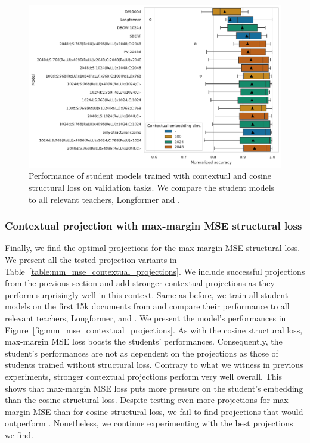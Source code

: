 \begin{figure}

  \includegraphics[width=\textwidth]{img/projections_contextual_cos.pdf}

  \caption{Performance of student models trained with contextual and cosine
  structural loss on validation tasks. We compare the student models to all
  relevant teachers, Longformer and .}

  \label{fig:cos_projections_contextual}

\end{figure}

\subsubsection{Contextual projection with max-margin MSE structural
loss}\label{section:projections_mm_mse}

Finally, we find the optimal projections for the max-margin MSE structural
loss. We present all the tested projection variants in
Table~\ref{table:mm_mse_contextual_projections}. We include successful
projections from the previous section and add stronger contextual projections
as they perform surprisingly well in this context. Same as before, we train all
student models on the first 15k documents from  and compare
their performance to all relevant teachers, Longformer, and
. We present the model's performances in
Figure~\ref{fig:mm_mse_contextual_projections}. As with the cosine structural
loss, max-margin MSE loss boosts the students' performances. Consequently, the
student's performances are not as dependent on the projections as those of
students trained without structural loss. Contrary to what we witness in
previous experiments, stronger contextual projections perform very well
overall. This shows that max-margin MSE loss puts more pressure on the student's
embedding than the cosine structural loss. Despite testing even more
projections for max-margin MSE than for cosine structural loss, we fail to find
projections that would outperform . Nonetheless,
we continue experimenting with the best projections we find.

